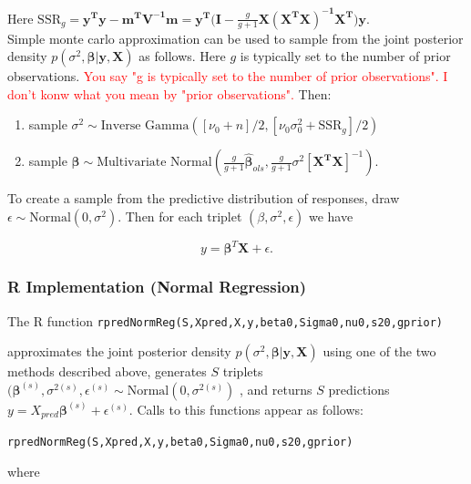 \documentclass[12pt, a4paper]{article}
\begin{document}
\noindent Here $\text{SSR}_g = \mathbf{y^Ty - m^TV^{-1}m = y^T(I - }\frac{g}{g+1}\mathbf{X(X^TX)^{-1}X^T)y}$.\\

Simple monte carlo approximation can be used to sample from the joint posterior density $p(\sigma^2,\boldsymbol\beta|\mathbf{y,X})$ as follows.  Here $g$ is typically set to the number of prior observations.  \textcolor{red}{You say "g is typically set to the number of prior observations". I don't konw what you mean by "prior observations".} Then:

\begin{enumerate}
    \item sample $\sigma^2 \sim \text{Inverse Gamma}([\nu_0 + n]/2,[\nu_0\sigma^2_0 + \text{SSR}_g]/2)$
    \item sample $\boldsymbol\beta \sim \text{Multivariate Normal}\left(\frac{g}{g+1}\hat{\boldsymbol\beta}_{ols},\frac{g}{g+1}\sigma^2[\mathbf{X^TX}]^{-1}\right)$.
\end{enumerate}

\noindent To create a sample from the predictive distribution of responses, draw $\epsilon \sim \text{Normal}(0,\sigma^2)$.  Then for each triplet $(\beta,\sigma^2,\epsilon)$ we have

$$y = \boldsymbol\beta^T\mathbf{X} + \epsilon.$$

  \subsubsection{R Implementation (Normal Regression)}

The R function \texttt{rpredNormReg(S,Xpred,X,y,beta0,Sigma0,nu0,s20,gprior)}

\noindent approximates the joint posterior density $p(\sigma^2,\boldsymbol\beta|\mathbf{y,X})$ using one of the two methods described above, generates $S$ triplets $(\boldsymbol\beta^{(s)}, \sigma^{2(s)},\epsilon^{(s)} \sim \text{Normal}(0,\sigma^{2(s)})$ , and returns $S$ predictions $y = X_{pred}\boldsymbol\beta^{(s)} + \epsilon^{(s)}$.  Calls to this functions appear as follows:


\begin{center}
  \texttt{rpredNormReg(S,Xpred,X,y,beta0,Sigma0,nu0,s20,gprior)}\\
\end{center}

\noindent where
\end{document}
